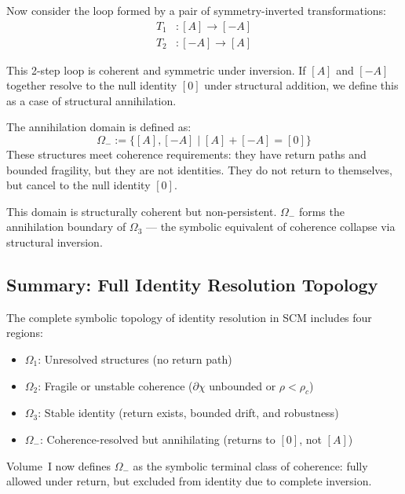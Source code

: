 Now consider the loop formed by a pair of symmetry-inverted transformations:
\begin{align}
T_1 &: [A] \rightarrow [-A] \label{eq:annihilation-t1} \\
T_2 &: [-A] \rightarrow [A] \label{eq:annihilation-t2}
\end{align}

This 2-step loop is coherent and symmetric under inversion. If $[A]$ and $[-A]$ together resolve to the null identity $[0]$ under structural addition, we define this as a case of structural annihilation.

\begin{definition} \label{def:omega-minus}
The annihilation domain is defined as:
\begin{equation} \label{eq:omega-minus}
\Omega_- := \{ [A], [-A] \mid [A] + [-A] = [0] \}
\end{equation}
These structures meet coherence requirements: they have return paths and bounded fragility, but they are not identities. They do not return to themselves, but cancel to the null identity $[0]$.
\end{definition}

This domain is structurally coherent but non-persistent.  
$\Omega_-$ forms the annihilation boundary of $\Omega_3$ — the symbolic equivalent of coherence collapse via structural inversion.

\subsection*{Summary: Full Identity Resolution Topology}

The complete symbolic topology of identity resolution in SCM includes four regions:

\begin{itemize}
  \item $\Omega_1$: Unresolved structures (no return path)
  \item $\Omega_2$: Fragile or unstable coherence ($\partial \chi$ unbounded or $\rho < \rho_c$)
  \item $\Omega_3$: Stable identity (return exists, bounded drift, and robustness)
  \item $\Omega_-$: Coherence-resolved but annihilating (returns to $[0]$, not $[A]$)
\end{itemize}

Volume~I now defines $\Omega_-$ as the symbolic terminal class of coherence: fully allowed under return, but excluded from identity due to complete inversion.
